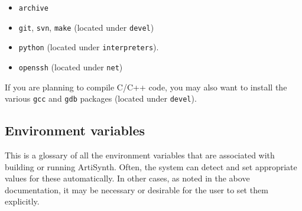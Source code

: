 \begin{itemize}

\item {\tt archive}
\item {\tt git}, {\tt svn}, {\tt make} (located under {\tt devel})
\item {\tt python} (located under {\tt interpreters}).
\item {\tt openssh} (located under {\tt net})

\end{itemize}

If you are planning to compile C/C++ code, you may also want to
install the various {\tt gcc} and {\tt gdb} packages (located under {\tt devel}).
\fi

\subsection{Environment variables}
\label{EnvironmentVariables}

This is a glossary of all the environment variables that are
associated with building or running ArtiSynth. Often, the system can
detect and set appropriate values for these automatically. In other
cases, as noted in the above documentation, it may be necessary or
desirable for the user to set them explicitly.

